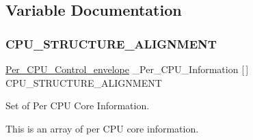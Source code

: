 \subsection{Variable Documentation}
\mbox{\label{group__PerCPU_ga0d4329f03b0319134ca2c192f96f4e5a}} 
\subsubsection{\texorpdfstring{CPU\_STRUCTURE\_ALIGNMENT}{CPU\_STRUCTURE\_ALIGNMENT}}
{\footnotesize\ttfamily \mbox{\hyperlink{structPer__CPU__Control__envelope}{Per\+\_\+\+C\+P\+U\+\_\+\+Control\+\_\+envelope}} \+\_\+\+Per\+\_\+\+C\+P\+U\+\_\+\+Information \mbox{[}$\,$\mbox{]} C\+P\+U\+\_\+\+S\+T\+R\+U\+C\+T\+U\+R\+E\+\_\+\+A\+L\+I\+G\+N\+M\+E\+NT}



Set of Per C\+PU Core Information. 

This is an array of per C\+PU core information. 